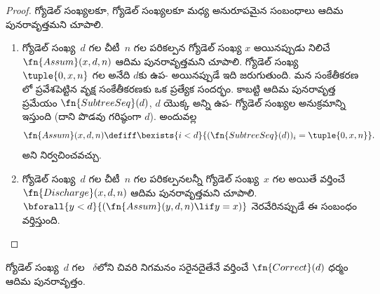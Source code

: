 \documentclass[../../../include/open-logic-section]{subfiles}
\begin{document}
\begin{proof}
   గ్యోడెల్ సంఖ్యలకూ,
   గ్యోడెల్ సంఖ్యలకూ మధ్య అనురూపమైన
  సంబంధాలు ఆదిమ పునరావృత్తమని చూపాలి.
  \begin{enumerate}
  \item గ్యోడెల్ సంఖ్య~$d$ గల 
    చీటీ~$n$ గల పరికల్పన గ్యోడెల్ సంఖ్య $x$ అయినప్పుడు నిలిచే
    $\fn{Assum}(x,d,n)$ ఆదిమ పునరావృత్తమని చూపాలి. గ్యోడెల్ సంఖ్య
    $\tuple{0,x,n}$ గల  అనేది $d$కు
    ఉప- అయినప్పుడే ఇది జరుగుతుంది.
    మన  సంకేతీకరణ
    లో ప్రవేశపెట్టిన వృక్ష సంకేతీకరణకు ఒక ప్రత్యేక
    సందర్భం. కాబట్టి ఆదిమ పునరావృత్త ప్రమేయం $\fn{SubtreeSeq}(d)$,
    $d$ యొక్క అన్ని ఉప- గ్యోడెల్
సంఖ్యల అనుక్రమాన్ని ఇస్తుంది (దాని పొడవు గరిష్ఠంగా $d$). అందువల్ల
    \[
    \fn{Assum}(x,d,n)\defiff\bexists{i<d}{(\fn{SubtreeSeq}(d))_i=
      \tuple{0,x,n}}.
    \]
    అని నిర్వచించవచ్చు.
  \item గ్యోడెల్ సంఖ్య~$d$ గల 
    చీటీ~$n$ గల పరికల్పనలన్నీ గ్యోడెల్ సంఖ్య~$x$ గల
     అయితే వర్తించే $\fn{Discharge}(x,d,n)$
    ఆదిమ పునరావృత్తమని చూపాలి. $\bforall{y<d}{(\fn{Assum}(y,d,n)\lif y=x)}$
    నెరవేరినప్పుడే ఈ సంబంధం వర్తిస్తుంది.
  \end{enumerate}
\end{proof}

\begin{prop}
  గ్యోడెల్ సంఖ్య~$d$ గల ~$\delta$లోని
చివరి నిగమనం సరైనదైతేనే వర్తించే $\fn{Correct}(d)$ ధర్మం ఆదిమ పునరావృత్తం.
\end{prop}
\end{document}
